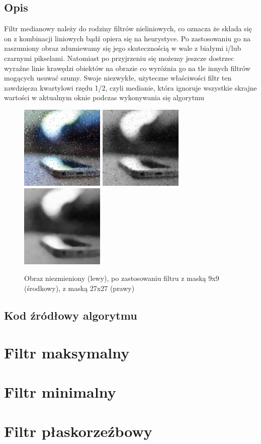 \documentclass[a4paper,12pt]{book}
\begin{document}
		\subsection{Opis}
			Filtr medianowy należy do rodziny filtrów nieliniowych, co oznacza że składa się on z kombinacji liniowych bądź opiera się na heurystyce. Po zastosowaniu go na zaszumiony obraz zdumiewamy się jego skutecznością w wale z białymi i/lub czarnymi pikselami. Natomiast po przyjrzeniu się możemy jeszcze dostrzec wyraźne linie krawędzi obiektów na obrazie co wyróżnia go na tle innych filtrów mogących usuwać szumy. Swoje niezwykłe, użyteczne właściwości filtr ten zawdzięcza kwartylowi rzędu 1/2, czyli medianie, która ignoruje wszystkie skrajne wartości w aktualnym oknie podczas wykonywania się algorytmu
			\begin{figure}[H]
				\caption{Obraz niezmieniony (lewy), po zastosowaniu filtru z maską 9x9 (środkowy), z maską 27x27 (prawy)}
				\includegraphics[width=4cm, height=4cm]{phone-noise-unmodified.jpg}
				\includegraphics[width=4cm, height=4cm]{phone-filter-median9x9.png}
				\includegraphics[width=4cm, height=4cm]{phone-filter-median27x27.png}
			\end{figure}
		\subsection{Kod źródłowy algorytmu}
	\section{Filtr maksymalny}
	\section{Filtr minimalny}
	\section{Filtr płaskorzeźbowy}
\end{document}

